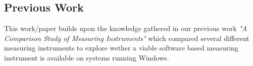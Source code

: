 \subsection{Previous Work}
This work/paper builds upon the knowledge gathered in our previous work \textit{"A Comparison Study of Measuring Instruments"}\cite{biksbois} which compared several different measuring instruments to explore wether a viable software based measuring instrument is available on systems running Windows.